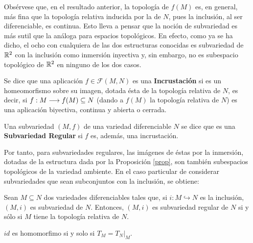 \documentclass[cursovd_portada.tex]{subfiles}
\begin{document}
Obsérvese que, en el resultado anterior, la topología de $f(M)$ es, en general, más fina que la topología relativa
inducida por la de $N$, pues la inclusión, al ser diferenciable, es continua. Esto lleva a pensar que la noción de
subvariedad es más sutil que la análoga para espacios topológicos. En efecto, como ya se ha dicho, el ocho con
cualquiera de las dos estructuras conocidas es subvariedad de $\mathbb{R}^2$ con la inclusión como inmersión inyectiva y,
sin embargo, no es subespacio topológico de $\mathbb{R}^2$ en ninguno de los dos casos.
\begin{defi}
Se dice que una aplicación $f\in\mathcal{F}(M,N)$ es una {\bf In\-crus\-ta\-ción} si es un homeomorfismo sobre su
imagen, dotada ésta de la topología relativa de $N$, es decir, si $f:M\longrightarrow f(M)\subseteq N$ (dando a $f(M)$ la
topología relativa de $N$) es una aplicación biyectiva, continua y abierta o cerrada. \end{defi}
\begin{defi}
Una subvariedad $(M,f)$ de una variedad diferenciable $N$ se dice que es una {\bf Subvariedad Regular} si $f$ es,
además, una incrustación.
\end{defi}
Por tanto, para subvariedades regulares, las imágenes de éstas por la inmersión, dotadas de la estructura dada por
la Proposición \ref{prop}, son también subespacios topológicos de la variedad ambiente. En el caso particular de
considerar subvariedades que sean subconjuntos con la inclusión, se obtiene:
\begin{prop}
Sean $M\subseteq N$ dos variedades diferenciables tales que, si $i:M\hookrightarrow N$ es la inclusión, $(M,i)$ es
subvariedad de $N$. Entonces, $(M,i)$ es subvariedad regular de $N$ si y sólo si $M$ tiene la topología relativa
de $N$.
\end{prop}
\begin{dem}
$id$ es homomorfimo si y solo si $T_M = T_{N}|_M$.
\end{dem}
\end{document}
